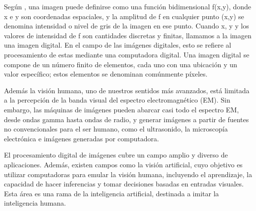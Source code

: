 	
	Según \parencite{gonzalez2008digital}, una imagen puede definirse como una función bidimensional f(x,y), donde x e y son coordenadas espaciales, y la amplitud de f en cualquier punto (x,y) se denomina intensidad o nivel de gris de la imagen en ese punto. Cuando x, y y los valores de intensidad de f son cantidades discretas y finitas, llamamos a la imagen una imagen digital. En el campo de las imágenes digitales, esto se refiere al procesamiento de estas mediante una computadora digital. Una imagen digital se compone de un número finito de elementos, cada uno con una ubicación y un valor específico; estos elementos se denominan comúnmente píxeles.
	
	Además la visión humana, uno de nuestros sentidos más avanzados, está limitada a la percepción de la banda visual del espectro electromagnético (EM). Sin embargo, las máquinas de imágenes pueden abarcar casi todo el espectro EM, desde ondas gamma hasta ondas de radio, y generar imágenes a partir de fuentes no convencionales para el ser humano, como el ultrasonido, la microscopía electrónica e imágenes generadas por computadora.
	
	El procesamiento digital de imágenes cubre un campo amplio y diverso de aplicaciones. Además, existen campos como la visión artificial, cuyo objetivo es utilizar computadoras para emular la visión humana, incluyendo el aprendizaje, la capacidad de hacer inferencias y tomar decisiones basadas en entradas visuales. Esta área es una rama de la inteligencia artificial, destinada a imitar la inteligencia humana.
	
	
